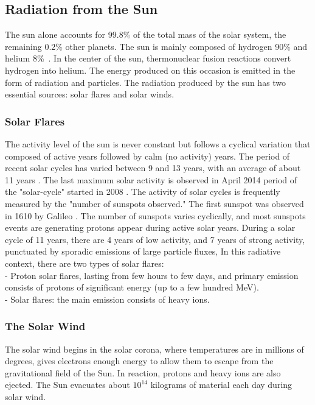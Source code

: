 \subsection{Radiation from the Sun} 

The sun alone accounts for 99.8\% of the total mass of the solar system, the remaining 0.2\% other planets. The sun is mainly composed of hydrogen 90\% and helium 8\%~\citep{wikisun}. In the center of the sun, thermonuclear fusion reactions convert hydrogen into helium. The energy produced on this occasion is emitted in the form of radiation and particles. The radiation produced by the sun has two essential sources: solar flares and solar winds. 

\subsubsection{Solar Flares} 

The activity level of the sun is never constant but follows a cyclical variation that composed of active years followed by calm (no activity) years. The period of recent solar cycles has
varied between 9 and 13 years, with an average of about 11 years \citep{nasa}. The last maximum solar activity is observed in April 2014 period of the "solar-cycle" started in 2008 \citep{nasa}. The activity of solar cycles is frequently measured by the "number of sunspots observed." The first sunspot was observed in 1610 by Galileo \citep{nasa}. The number of sunspots varies cyclically, and most sunspots events are
generating protons appear during active solar years. During a solar cycle of 11 years, there are 4 years of low activity, and 7 years of strong activity, punctuated by sporadic emissions of large particle fluxes, In this radiative context, there are two types of solar flares: \\
- Proton solar flares, lasting from few hours to few days, and primary emission consists of protons of significant energy (up to
a few hundred MeV). \\
- Solar flares: the main emission consists of heavy ions.

\subsubsection{The Solar Wind}

The solar wind begins in the solar corona, where temperatures are in millions of degrees, gives electrons enough energy to allow them to
escape from the gravitational field of the Sun. In reaction, protons and heavy ions are also ejected. The Sun evacuates about $10^{14}$ kilograms of material each day during solar wind. 


